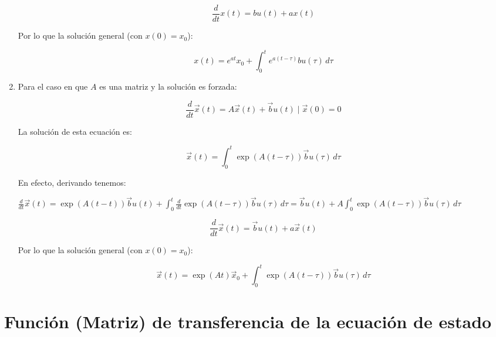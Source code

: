 \begin{enumerate}
        \begin{equation}
            \frac{d}{dt} x(t) = b u(t) + a x(t)
        \end{equation}

        Por lo que la solución general (con $x(0) = x_0$):

        \begin{equation}
            x(t) = e^{at} x_0 + \int_0^t e^{a(t-\tau)} b u(\tau) \, d \tau
        \end{equation}

    \item Para el caso en que $A$ es una matriz y la solución es forzada:

        \begin{equation}
            \frac{d}{dt} \vec{x}(t) = A \vec{x}(t) + \vec{b} u(t) \mid \vec{x}(0) = 0
        \end{equation}

        La solución de esta ecuación es:

        \begin{equation}
            \vec{x}(t) = \int_0^t \exp{(A(t-\tau))} \vec{b} u(\tau) \, d \tau
        \end{equation}

        En efecto, derivando tenemos:

        \begin{math}
            \frac{d}{dt} \vec{x}(t) = \exp{(A(t-t))} \vec{b} u(t) + \int_0^t \frac{d}{dt} \exp{(A(t-\tau))} \vec{b} u(\tau) \, d \tau = \vec{b} u(t) + A \int_0^t \exp{(A(t-\tau))} \vec{b} u(\tau) \, d \tau
        \end{math}

        \begin{equation}
            \frac{d}{dt} \vec{x}(t) = \vec{b} u(t) + a \vec{x}(t)
        \end{equation}

        Por lo que la solución general (con $x(0) = x_0$):

        \begin{equation}
            \vec{x}(t) = \exp{(At)} \vec{x}_0 + \int_0^t \exp{(A(t-\tau))} \vec{b} u(\tau) \, d \tau
        \end{equation}

    \end{enumerate}

    \section{Función (Matriz) de transferencia de la ecuación de estado}

